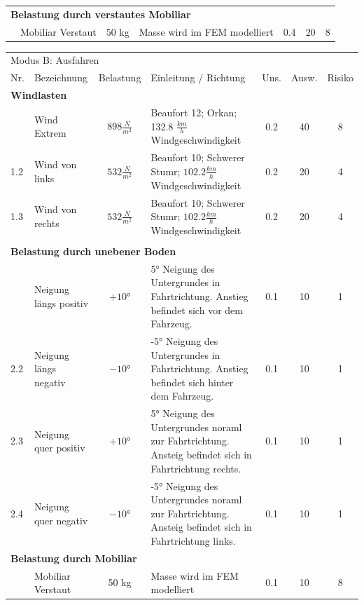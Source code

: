 \begin{landscape}
\begin{tabularx}{\linewidth}{llcXccc}
    \multicolumn{7}{l}{\textbf{Belastung durch verstautes Mobiliar}}\\
    \thickhline
    4.1 & Mobiliar Verstaut & 50 kg & Masse wird im FEM modelliert & 0.4 & 20 & 8\\
  \end{tabularx}
\end{landscape}

\begin{landscape}%
  \centering %
  \begin{tabularx}{\linewidth}{llcXccc}
    \multicolumn{7}{l}{\LARGE{Modus B: Ausfahren}}\\
    \thickhline
    Nr. & Bezeichnung & Belastung & Einleitung / Richtung & Uns. & Ausw. & Risiko\\
    \hline
    \multicolumn{7}{l}{\textbf{Windlasten}}\\
    \thickhline
    1.1 & Wind Extrem     & $898 \frac{N}{m^2}$ & Beaufort 12; Orkan; 132.8 $\frac{km}{h}$  Windgeschwindigkeit         & 0.2 & 40 & 8\\
    1.2 & Wind von links  & $532 \frac{N}{m^2}$ & Beaufort 10; Schwerer Stumr; $102.2 \frac{km}{h}$ Windgeschwindigkeit & 0.2 & 20 & 4\\
    1.3 & Wind von rechts & $532 \frac{N}{m^2}$ & Beaufort 10; Schwerer Stumr; $102.2 \frac{km}{h}$ Windgeschwindigkeit & 0.2 & 20 & 4\\
    \\[\lineHeightTable]

    \multicolumn{7}{l}{\textbf{Belastung durch unebener Boden}}\\
    \thickhline
    2.1	& Neigung längs positiv & $+10°$ & 5° Neigung des Untergrundes in Fahrtrichtung. Anstieg befindet sich vor dem Fahrzeug. & 0.1 & 10 & 1\\
    2.2	& Neigung längs negativ & $-10°$ & -5° Neigung des Untergrundes in Fahrtrichtung. Anstieg befindet sich hinter dem Fahrzeug. & 0.1 & 10 & 1\\
    2.3	& Neigung quer positiv  & $+10°$ & 5° Neigung des Untergrundes noraml zur Fahrtrichtung. Ansteig befindet sich in Fahrtrichtung rechts. & 0.1 & 10 & 1\\
    2.4	& Neigung quer negativ  & $-10°$ & -5° Neigung des Untergrundes noraml zur Fahrtrichtung. Ansteig befindet sich in Fahrtrichtung links. & 0.1 & 10 & 1\\

    \multicolumn{7}{l}{\textbf{Belastung durch  Mobiliar}}\\
    \thickhline
    3.1 & Mobiliar Verstaut & 50 kg & Masse wird im FEM modelliert & 0.1 & 10 & 8\\
  \end{tabularx}
\end{landscape}

